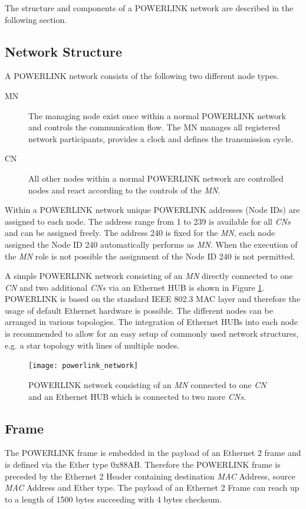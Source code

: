 The structure and components of a POWERLINK network are described in the following section.

\subsection{Network Structure}
\label{sec:oplk_powerlink_network}
A POWERLINK network consists of the following two different node types.

\begin{description}
    \item[MN] The managing node exist once within a normal POWERLINK network and controls the communication flow.
    The MN manages all registered network participants, provides a clock and defines the transmission cycle.
    \item[CN] All other nodes within a normal POWERLINK network are controlled nodes and react according to the controls of the \emph{MN}.
\end{description}

Within a POWERLINK network unique POWERLINK addresses (Node IDs) are assigned to each node.
The address range from 1 to 239 is available for all \emph{CNs} and can be assigned freely.
The address 240 is fixed for the \emph{MN}, each node assigned the Node ID 240 automatically performs as \emph{MN}.
When the execution of the \emph{MN} role is not possible the assignment of the Node ID 240 is not permitted.
\cite[section 4.5]{epsg_epsg_2013}

A simple POWERLINK network consisting of an \emph{MN} directly connected to one \emph{CN} and two additional \emph{CNs} via an Ethernet HUB is shown in Figure \ref{fig:powerlink_network}.
POWERLINK is based on the standard IEEE 802.3 MAC layer and therefore the usage of default Ethernet hardware is possible.
The different nodes can be arranged in various topologies.
The integration of Ethernet HUBs into each node is recommended to allow for an easy setup of commonly used network structures, e.g. a star topology with lines of multiple nodes. \cite[chapter 3]{epsg_epsg_2013}

\begin{figure}
    \centering
    \texttt{[image: powerlink\_network]}
    \caption{POWERLINK network consisting of an \emph{MN} connected to one \emph{CN} and an Ethernet HUB which is connected to two more \emph{CNs}.}
    \label{fig:powerlink_network}
\end{figure}

\subsection{Frame}
\label{sec:oplk_powerlink_frame}
The POWERLINK frame is embedded in the payload of an Ethernet 2 frame and is defined via the Ether type 0x88AB.
Therefore the POWERLINK frame is preceded by the Ethernet 2 Header containing destination \emph{MAC} Address, source \emph{MAC} Address and Ether type.
The payload of an Ethernet 2 Frame can reach up to a length of 1500 bytes succeeding with 4 bytes checksum. \cite[section 3.2]{ethernet_ieee_2016} \cite[section 4.6.1]{epsg_epsg_2013}


